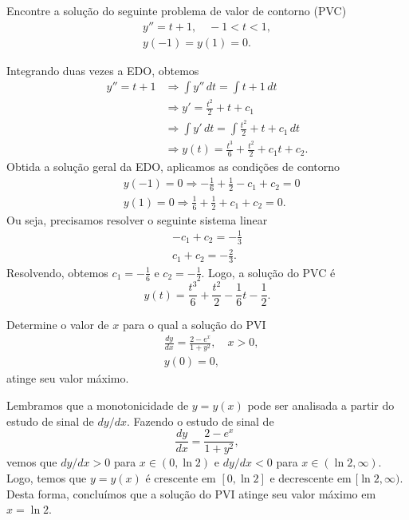 \begin{exeresol}
  Encontre a solução do seguinte problema de valor de contorno (PVC)
  \begin{align}
    y'' = t + 1,\quad -1 < t < 1, \\
    y(-1) = y(1) = 0.
  \end{align}
\end{exeresol}
\begin{resol}
  Integrando duas vezes a EDO, obtemos
  \begin{align}
    y'' = t + 1 &\Rightarrow \int y''\,dt = \int t+1\,dt \\
                &\Rightarrow y' = \frac{t^2}{2} + t + c_1 \\
                &\Rightarrow \int y'\,dt = \int \frac{t^2}{2} + t + c_1 \,dt \\
                &\Rightarrow y(t) =  \frac{t^3}{6} + \frac{t^2}{2} + c_1t + c_2.
  \end{align}
  Obtida a solução geral da EDO, aplicamos as condições de contorno
  \begin{align}
    &y(-1) = 0 \Rightarrow -\frac{1}{6} + \frac{1}{2} - c_1 + c_2 = 0\\
    &y(1) = 0 \Rightarrow \frac{1}{6} + \frac{1}{2} + c_1 + c_2 = 0.
  \end{align}
  Ou seja, precisamos resolver o seguinte sistema linear
  \begin{align}
    -c_1 + c_2 = -\frac{1}{3} \\
    c_1 + c_2 = -\frac{2}{3}.
  \end{align}
  Resolvendo, obtemos $c_1 = -\frac{1}{6}$ e $c_2 = -\frac{1}{2}$. Logo, a solução do PVC é
  \begin{equation}
    y(t) = \frac{t^3}{6} + \frac{t^2}{2} - \frac{1}{6}t - \frac{1}{2}.
  \end{equation}
\end{resol}

\begin{exeresol}
  Determine o valor de $x$ para o qual a solução do PVI
  \begin{align}
    &\frac{dy}{dx} = \frac{2-e^x}{1 + y^2},\quad x>0,\\
    &y(0)=0,
  \end{align}
  atinge seu valor máximo.
\end{exeresol}
\begin{resol}
  Lembramos que a monotonicidade de $y = y(x)$ pode ser analisada a partir do estudo de sinal de $dy/dx$. Fazendo o estudo de sinal de
  \begin{equation}
    \frac{dy}{dx} = \frac{2-e^x}{1+y^2},
  \end{equation}
  vemos que $dy/dx > 0$ para $x\in (0, \ln 2)$ e $dy/dx < 0$ para $x\in (\ln 2, \infty)$. Logo, temos que $y = y(x)$ é crescente em $[0, \ln 2]$ e decrescente em $[\ln 2, \infty)$. Desta forma, concluímos que a solução do PVI atinge seu valor máximo em $x = \ln 2$.
\end{resol}

